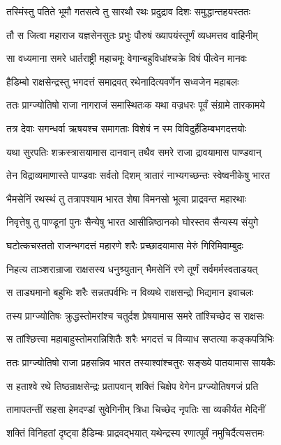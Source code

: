 \twolineshloka
{तस्मिंस्तु पतिते भूमौ गतसत्वे तु सारथौ}
{रथः प्रदुद्राव दिशः समुद्धान्तहयस्ततः}


\twolineshloka
{तौ स जित्वा महाराज यज्ञसेनसुतः प्रभुः}
{पौरुषं ख्यापयंस्तूर्णं व्यधमत्तव वाहिनीम्}


\twolineshloka
{सा वध्यमाना समरे धार्तराष्ट्री महाचमूः}
{वेगान्बहुविधांश्चक्रे विषं पीत्वेन मानवः}


\twolineshloka
{हैडिम्बो राक्षसेन्द्रस्तु भगदत्तं समाद्रवत्}
{रथेनादित्यवर्णेन सध्वजेन महाबलः}


\twolineshloka
{ततः प्राग्ज्योतिषो राजा नागराजं समास्थितःक}
{यथा वज्रधरः पूर्वं संग्रामे तारकामये}


\twolineshloka
{तत्र देवाः सगन्धर्वा ऋषयश्च समागताः}
{विशेषं न स्म विविदुर्हैडिम्बभगदत्तयोः}


\twolineshloka
{यथा सुरपतिः शक्रस्त्रासयामास दानवान्}
{तथैव समरे राजा द्रावयामास पाण्डवान्}


\twolineshloka
{तेन विद्राव्यमाणास्ते पाण्डवाः सर्वतो दिशम्}
{त्रातारं नाभ्यगच्छन्तः स्वेष्वनीकेषु भारत}


\twolineshloka
{भैमसेनिं रथस्थं तु तत्रापश्याम भारत}
{शेषा विमनसो भूत्वा प्राद्रवन्त महारथाः}


\twolineshloka
{निवृत्तेषु तु पाण्डूनां पुनः सैन्येषु भारत}
{आसीन्निष्ठानको घोरस्तव सैन्यस्य संयुगे}


\twolineshloka
{घटोत्कचस्ततो राजन्भगदत्तं महारणे}
{शरैः प्रच्छादयामास मेरुं गिरिमिवाम्बुदः}


\twolineshloka
{निहत्य ताञ्शरान्राजा राक्षसस्य धनुश्र्युतान्}
{भैमसेनिं रणे तूर्णं सर्वमर्मस्वताडयत्}


\twolineshloka
{स ताड्यमानो बहुभिः शरैः सन्नतपर्वभिः}
{न विव्यथे राक्षसन्द्रो भिद्यमान इवाचलः}


\twolineshloka
{तस्य प्राग्ज्योतिषः क्रुद्धस्तोमरांश्च चतुर्दश}
{प्रेषयामास समरे तांश्चिच्छेद स राक्षसः}


\twolineshloka
{स तांश्छित्त्वा महाबाहुस्तोमरान्निशितैः शरैः}
{भगदत्तं च विव्याध सप्तत्या कङ्कपत्रिभिः}


\twolineshloka
{ततः प्राग्ज्योतिषो राजा प्रहसन्निव भारत}
{तस्याश्वांश्चतुरः सङ्ख्ये पातयामास सायकैः}


\twolineshloka
{स हताश्वे रथे तिष्ठन्राक्षसेन्द्रः प्रतापवान्}
{शक्तिं चिक्षेप वेगेन प्रग्ज्योतिषगजं प्रति}


\twolineshloka
{तामापतन्तीं सहसा हेमदण्डां सुवेगिनीम्}
{त्रिधा चिच्छेद नृपतिः सा व्यकीर्यत मेदिनीं}


\twolineshloka
{शक्तिं विनिहतां दृष्ट्वा हैडिम्बः प्राद्रवद्भयात्}
{यथेन्द्रस्य रणात्पूर्वं नमुचिर्दैत्यसत्तमः}


